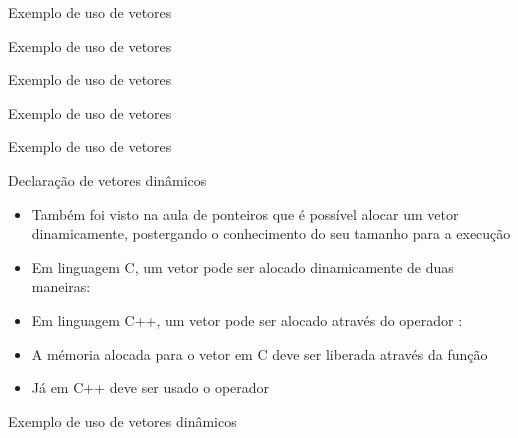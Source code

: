 \begin{frame}[fragile]{Exemplo de uso de vetores}
\end{frame}

\begin{frame}[fragile]{Exemplo de uso de vetores}
\end{frame}

\begin{frame}[fragile]{Exemplo de uso de vetores}
\end{frame}

\begin{frame}[fragile]{Exemplo de uso de vetores}
\end{frame}

\begin{frame}[fragile]{Exemplo de uso de vetores}
\end{frame}

\begin{frame}[fragile]{Declaração de vetores dinâmicos}

	\begin{itemize}
		\item Também foi visto na aula de ponteiros que é possível alocar um vetor dinamicamente, 
        postergando o conhecimento do seu tamanho para a execução

		\item Em linguagem C, um vetor pode ser alocado dinamicamente 
		de {duas} maneiras:

		\item Em linguagem C++, um vetor pode ser alocado através do 
		operador :

		\item A mémoria alocada para o vetor em C deve ser liberada através da função 

		\item Já em C++ deve ser usado o operador 
		
	\end{itemize}

\end{frame}

\begin{frame}[fragile]{Exemplo de uso de vetores dinâmicos}
\end{frame}

